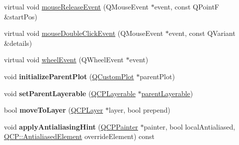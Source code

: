 \begin{DoxyCompactItemize}
\item 
virtual void \hyperlink{classQCPLayerable_aa0d79b005686f668622bbe66ac03ba2c}{mouse\+Release\+Event} (Q\+Mouse\+Event $\ast$event, const Q\+PointF \&start\+Pos)
\item 
virtual void \hyperlink{classQCPLayerable_a4171e2e823aca242dd0279f00ed2de81}{mouse\+Double\+Click\+Event} (Q\+Mouse\+Event $\ast$event, const Q\+Variant \&details)
\item 
virtual void \hyperlink{classQCPLayerable_a47dfd7b8fd99c08ca54e09c362b6f022}{wheel\+Event} (Q\+Wheel\+Event $\ast$event)
\item 
\mbox{\label{classQCPLayerable_a8cbe5a0c9a5674249982f5ca5f8e02bc}} 
void {\bfseries initialize\+Parent\+Plot} (\hyperlink{classQCustomPlot}{Q\+Custom\+Plot} $\ast$parent\+Plot)
\item 
\mbox{\label{classQCPLayerable_aa23c893671f1f6744ac235cf2204cf3a}} 
void {\bfseries set\+Parent\+Layerable} (\hyperlink{classQCPLayerable}{Q\+C\+P\+Layerable} $\ast$\hyperlink{classQCPLayerable_aa78b7e644d2c519e1a9a6f2ac5fcd858}{parent\+Layerable})
\item 
\mbox{\label{classQCPLayerable_af94484cfb7cbbddb7de522e9be71d9a4}} 
bool {\bfseries move\+To\+Layer} (\hyperlink{classQCPLayer}{Q\+C\+P\+Layer} $\ast$layer, bool prepend)
\item 
\mbox{\label{classQCPLayerable_acb663e375d2d36dc5c55021ee5a2119b}} 
void {\bfseries apply\+Antialiasing\+Hint} (\hyperlink{classQCPPainter}{Q\+C\+P\+Painter} $\ast$painter, bool local\+Antialiased, \hyperlink{namespaceQCP_ae55dbe315d41fe80f29ba88100843a0c}{Q\+C\+P\+::\+Antialiased\+Element} override\+Element) const
\end{DoxyCompactItemize}
